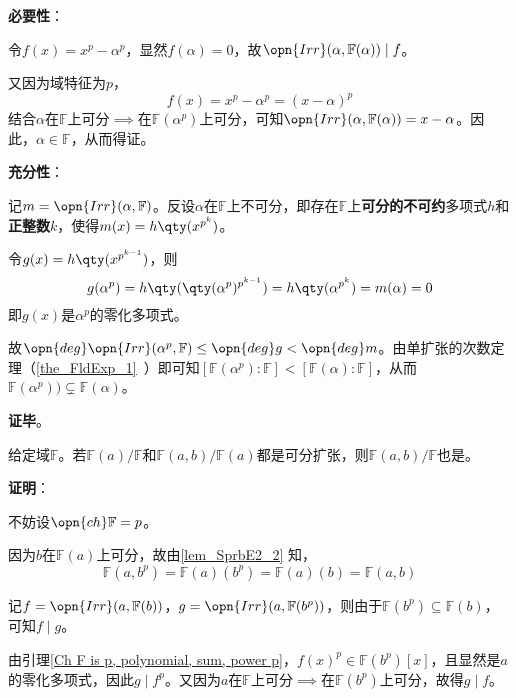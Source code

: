 \textbf{必要性}：

令$f(x)=x^p-\alpha^p$，显然$f(\alpha)=0$，故$\opn{Irr}(\alpha, \mathbb{F}(\alpha))\mid f$。

又因为域特征为$p$，
\begin{equation}
    f(x) = x^p-\alpha^p = (x-\alpha)^p
\end{equation}
结合$\alpha$在$\mathbb{F}$上可分$\implies$在$\mathbb{F}(\alpha^p)$上可分，可知$\opn{Irr}(\alpha, \mathbb{F}(\alpha))=x-\alpha$。因此，$\alpha\in\mathbb{F}$，从而得证。

\textbf{充分性}：

记$m=\opn{Irr}(\alpha, \mathbb{F})$。反设$\alpha$在$\mathbb{F}$上不可分，即存在$\mathbb{F}$上\textbf{可分的不可约}多项式$h$和\textbf{正整数}$k$，使得$m(x)=h\qty(x^{p^k})$。

令$g(x)=h\qty(x^{p^{k-1}})$，则
\begin{equation}
    g(\alpha^p)= h\qty(\qty(\alpha^{p})^{p^{k-1}}) = h\qty(\alpha^{p^k}) = m(\alpha) = 0
\end{equation}
即$g(x)$是$\alpha^p$的零化多项式。

故$\opn{deg}\opn{Irr}(\alpha^p, \mathbb{F})\leq \opn{deg}g< \opn{deg}m$。由单扩张的次数定理（\autoref{the_FldExp_1}~）即可知$[\mathbb{F}(\alpha^p):\mathbb{F}]<[\mathbb{F}(\alpha):\mathbb{F}]$，从而$\mathbb{F}(\alpha^p))\subsetneq\mathbb{F}(\alpha)$。

\textbf{证毕}。





\begin{lemma}{}
给定域$\mathbb{F}$。若$\mathbb{F}(a)/\mathbb{F}$和$\mathbb{F}(a, b)/\mathbb{F}(a)$都是可分扩张，则$\mathbb{F}(a, b)/\mathbb{F}$也是。
\end{lemma}

\textbf{证明}：

不妨设$\opn{ch}\mathbb{F}=p$。

因为$b$在$\mathbb{F}(a)$上可分，故由\autoref{lem_SprbE2_2} 知，
\begin{equation}
    \mathbb{F}(a, b^p) = \mathbb{F}(a)(b^p) = \mathbb{F}(a)(b) = \mathbb{F}(a, b)
\end{equation}




记$f=\opn{Irr}(a, \mathbb{F}(b))$，$g=\opn{Irr}(a, \mathbb{F}(b^p))$，则由于$\mathbb{F}(b^p)\subseteq\mathbb{F}(b)$，可知$f\mid g$。

由引理\ref{Ch F is p, polynomial, sum, power p}，$f(x)^p\in\mathbb{F}(b^p)[x]$，且显然是$a$的零化多项式，因此$g\mid f^p$。又因为$a$在$\mathbb{F}$上可分$\implies$在$\mathbb{F}(b^p)$上可分，故得$g\mid f$。

